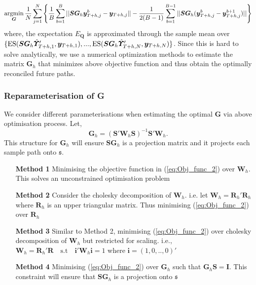 \begin{equation}\label{eq:Obj_func_2}
\operatornamewithlimits{argmin}_{\bm{G}} \frac{1}{N}\sum_{j=1}^{N}\left\{\frac{1}{B}\sum_{b=1}^{B}||\bm{SG}_h\bm{y}_{T+h,j}^b -\bm{y}_{T+h,j}||-\frac{1}{2(B-1)}\sum_{b=1}^{B-1}||\bm{SG}_h(\bm{y}_{T+h,j}^b -\bm{y}_{T+h,j}^{b+1})||\right\}
\end{equation}
where, the expectation $E_{\bm{Q}}$ is approximated through the sample mean over $\{\text{ES}(\bm{SG}_h\hat{\bm{\Upsilon}}'_{T+h,1}, \bm{y}_{T+h,1}),...,\\
\text{ES}(\bm{SG}_h\hat{\bm{\Upsilon}}'_{T+h,N}, \bm{y}_{T+h,N})\}$.   
Since this is hard to solve analytically, we use a numerical optimization methods to estimate the matrix $\bm{G}_h$ that minimizes above objective function and thus obtain the optimally reconciled future paths. 

\subsubsection{Reparameterisation of G} \label{subsubsec:ReparameterisationG}

We consider different parameterisations when estimating the optimal $\bm{G}$ via above optimisation process. Let,  
\begin{equation}\label{eq:StructureofG}
\bm{G}_h = (\bm{S'W}_h\bm{S})^{-1}\bm{S'W}_h.
\end{equation}
This structure for $\bm{G}_h$ will ensure $\bm{SG}_h$ is a projection matrix and it projects each sample path onto $\mathfrak{s}$. 
\begin{itemize}
	\item[\textbf{Method 1}] Minimising the objective function in (\ref{eq:Obj_func_2}) over $\bm{W}_h$. This solves an unconstrained optimisation problem 
	\item[\textbf{Method 2}] Consider the cholesky decomposition of $\bm{W}_h$. i.e. let $\bm{W}_h = \bm{R}_h'\bm{R}_h$ where $\bm{R}_h$ is an upper triangular matrix. Thus minimising  (\ref{eq:Obj_func_2}) over $\bm{R}_h$ 
	\item[\textbf{Method 3}] Similar to Method 2, minimising (\ref{eq:Obj_func_2}) over cholesky decomposition of $\bm{W}_h$ but restricted for scaling. i.e., $\bm{W}_h=\bm{R}_h'\bm{R} \quad \text{s.t} \quad \bm{i'}\bm{W}_h\bm{i}=1$ where $\bm{i}=(1,0,..,0)'$
	\item[\textbf{Method 4}] Minimising (\ref{eq:Obj_func_2}) over $\bm{G}_h$ such that $\bm{G}_h\bm{S}=\bm{I}$. This constraint will ensure that $\bm{SG}_h$ is a projection onto $\mathfrak{s}$
	  
\end{itemize}    



